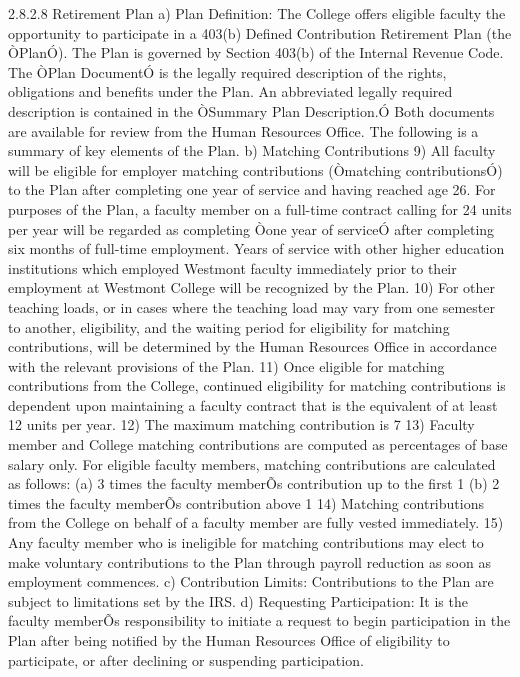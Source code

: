 \documentclass[letterpaper, 11pt]{article}
\begin{document}
	2.8.2.8 Retirement Plan
	a) Plan Definition:  The College offers eligible faculty the opportunity to participate in a 403(b) Defined Contribution Retirement Plan (the ÒPlanÓ).  The Plan is governed by Section 403(b) of the Internal Revenue Code.  The ÒPlan DocumentÓ is the legally required description of the rights, obligations and benefits under the Plan.  An abbreviated legally required description is contained in the ÒSummary Plan Description.Ó  Both documents are available for review from the Human Resources Office.  The following is a summary of key elements of the Plan.
	b) Matching Contributions
	9) All faculty will be eligible for employer matching contributions (Òmatching contributionsÓ) to the Plan after completing one year of service and having reached age 26.  For purposes of the Plan, a faculty member on a full-time contract calling for 24 units per year will be regarded as completing Òone year of serviceÓ after completing six months of full-time employment.  Years of service with other higher education institutions which employed Westmont faculty immediately prior to their employment at Westmont College will be recognized by the Plan.
	10) For other teaching loads, or in cases where the teaching load may vary from one semester to another, eligibility, and the waiting period for eligibility for matching contributions, will be determined by the Human Resources Office in accordance with the relevant provisions of the Plan.
	11) Once eligible for matching contributions from the College, continued eligibility for matching contributions is dependent upon maintaining a faculty contract that is the equivalent of at least 12 units per year.
	12) The maximum matching contribution is 7%
	13) Faculty member and College matching contributions are computed as percentages of base salary only.  For eligible faculty members, matching contributions are calculated as follows:
	(a) 3 times the faculty memberÕs contribution up to the first 1%
	(b) 2 times the faculty memberÕs contribution above 1%
	14) Matching contributions from the College on behalf of a faculty member are fully vested immediately.
	15) Any faculty member who is ineligible for matching contributions may elect to make voluntary contributions to the Plan through payroll reduction as soon as employment commences.
	c) Contribution Limits:  Contributions to the Plan are subject to limitations set by the IRS.
	d) Requesting Participation:  It is the faculty memberÕs responsibility to initiate a request to begin participation in the Plan after being notified by the Human Resources Office of eligibility to participate, or after declining or suspending participation.
\end{document}
